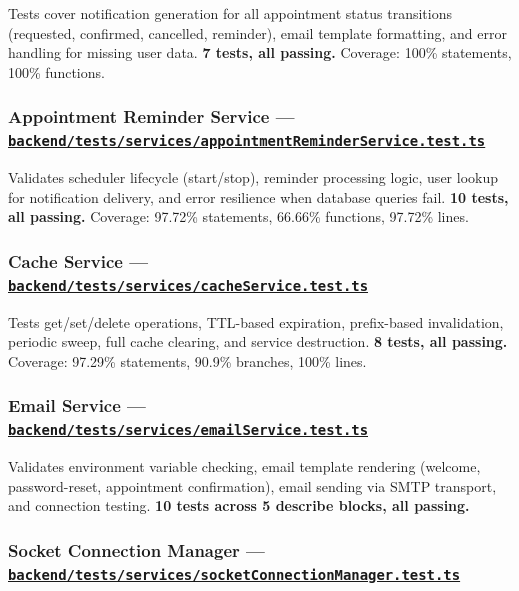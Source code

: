 \documentclass[12pt,letterpaper]{article}
\newcommand{\ghrepo}{https://github.com/omniV1/lunaraCare}
\begin{document}
Tests cover notification generation for all appointment status transitions (requested, confirmed, cancelled, reminder), email template formatting, and error handling for missing user data. \textbf{7 tests, all passing.} Coverage: 100\% statements, 100\% functions.

\subsubsection{Appointment Reminder Service --- \href{\ghrepo/blob/main/backend/tests/services/appointmentReminderService.test.ts}{\texttt{backend/tests/services/appointmentReminderService.test.ts}}}

Validates scheduler lifecycle (start/stop), reminder processing logic, user lookup for notification delivery, and error resilience when database queries fail. \textbf{10 tests, all passing.} Coverage: 97.72\% statements, 66.66\% functions, 97.72\% lines.

\subsubsection{Cache Service --- \href{\ghrepo/blob/main/backend/tests/services/cacheService.test.ts}{\texttt{backend/tests/services/cacheService.test.ts}}}

Tests get/set/delete operations, TTL-based expiration, prefix-based invalidation, periodic sweep, full cache clearing, and service destruction. \textbf{8 tests, all passing.} Coverage: 97.29\% statements, 90.9\% branches, 100\% lines.

\subsubsection{Email Service --- \href{\ghrepo/blob/main/backend/tests/services/emailService.test.ts}{\texttt{backend/tests/services/emailService.test.ts}}}

Validates environment variable checking, email template rendering (welcome, password-reset, appointment confirmation), email sending via SMTP transport, and connection testing. \textbf{10 tests across 5 describe blocks, all passing.}

\subsubsection{Socket Connection Manager --- \href{\ghrepo/blob/main/backend/tests/services/socketConnectionManager.test.ts}{\texttt{backend/tests/services/socketConnectionManager.test.ts}}}
\end{document}
